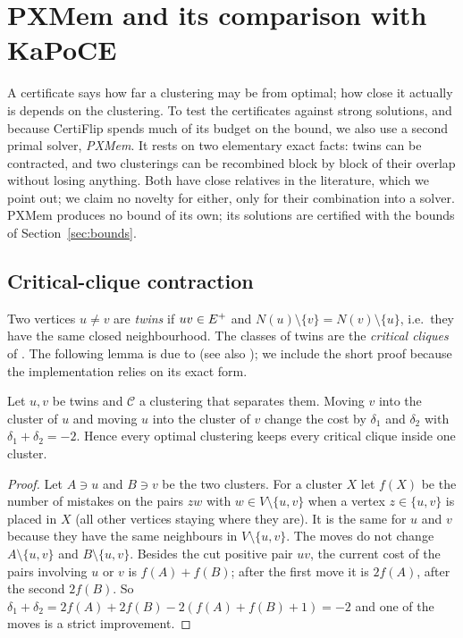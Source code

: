 \section{PXMem and its comparison with KaPoCE}\label{sec:primal}

A certificate says how far a clustering may be from optimal; how close it
actually is depends on the clustering.  To test the certificates against
strong solutions, and because CertiFlip spends much of its budget on the
bound, we also use a second primal solver, \emph{PXMem}.  It rests on two
elementary exact facts: twins can be contracted, and two clusterings can be
recombined block by block of their overlap without losing anything.  Both have
close relatives in the literature, which we point out; we claim no novelty for
either, only for their combination into a solver.  PXMem produces no bound of
its own; its solutions are certified with the bounds of
Section~\ref{sec:bounds}.

\subsection{Critical-clique contraction}

Two vertices $u\ne v$ are \emph{twins} if $uv\in E^{+}$ and $N(u)\setminus\{v\}=
N(v)\setminus\{u\}$, i.e.\ they have the same closed neighbourhood.  The classes
of twins are the \emph{critical cliques} of \citet{Guo09kernel}.  The
following lemma is due to \citet{Guo09kernel} (see also
\citet{ProttiDS09modular}); we include the short proof because the
implementation relies on its exact form.

\begin{lemma}\label{lem:twins}
Let $u,v$ be twins and $\mathcal C$ a clustering that separates them.  Moving
$v$ into the cluster of $u$ and moving $u$ into the cluster of $v$ change the
cost by $\delta_1$ and $\delta_2$ with $\delta_1+\delta_2=-2$.  Hence every
optimal clustering keeps every critical clique inside one cluster.
\end{lemma}
\begin{proof}
Let $A\ni u$ and $B\ni v$ be the two clusters.  For a cluster $X$ let
$f(X)$ be the number of mistakes on the pairs $zw$ with $w\in
V\setminus\{u,v\}$ when a vertex $z\in\{u,v\}$ is placed in $X$ (all other
vertices staying where they are).  It is the same for $u$ and $v$ because
they have the same neighbours in $V\setminus\{u,v\}$.  The moves do not change
$A\setminus\{u,v\}$ and $B\setminus\{u,v\}$.  Besides the cut positive pair $uv$,
the current cost of the pairs involving $u$ or $v$ is $f(A)+f(B)$; after the
first move it is $2f(A)$, after the second $2f(B)$.  So $\delta_1+\delta_2=2f(A)+2f(B)
-2(f(A)+f(B)+1)=-2$ and one of the moves is a strict improvement.
\end{proof}

